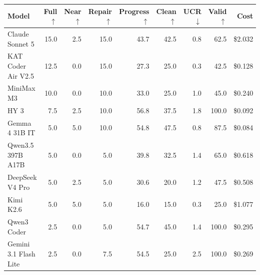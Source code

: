 \begin{tabular}{lrrrrrrrr}
\toprule
Model & Full $\uparrow$ & Near $\uparrow$ & Repair $\uparrow$ & Progress $\uparrow$ & Clean $\uparrow$ & UCR $\downarrow$ & Valid $\uparrow$ & Cost \\
\midrule
Claude Sonnet 5 & 15.0 & 2.5 & 15.0 & 43.7 & 42.5 & 0.8 & 62.5 & \$2.032 \\
KAT Coder Air V2.5 & 12.5 & 0.0 & 15.0 & 27.3 & 25.0 & 0.3 & 42.5 & \$0.128 \\
MiniMax M3 & 10.0 & 0.0 & 10.0 & 33.0 & 25.0 & 1.0 & 45.0 & \$0.240 \\
HY 3 & 7.5 & 2.5 & 10.0 & 56.8 & 37.5 & 1.8 & 100.0 & \$0.092 \\
Gemma 4 31B IT & 5.0 & 5.0 & 10.0 & 54.8 & 47.5 & 0.8 & 87.5 & \$0.084 \\
Qwen3.5 397B A17B & 5.0 & 0.0 & 5.0 & 39.8 & 32.5 & 1.4 & 65.0 & \$0.618 \\
DeepSeek V4 Pro & 5.0 & 2.5 & 5.0 & 30.6 & 20.0 & 1.2 & 47.5 & \$0.508 \\
Kimi K2.6 & 5.0 & 5.0 & 5.0 & 16.0 & 15.0 & 0.3 & 25.0 & \$1.077 \\
Qwen3 Coder & 2.5 & 0.0 & 5.0 & 54.7 & 45.0 & 1.4 & 100.0 & \$0.295 \\
Gemini 3.1 Flash Lite & 2.5 & 0.0 & 7.5 & 54.5 & 25.0 & 2.5 & 100.0 & \$0.269 \\
\bottomrule
\end{tabular}
